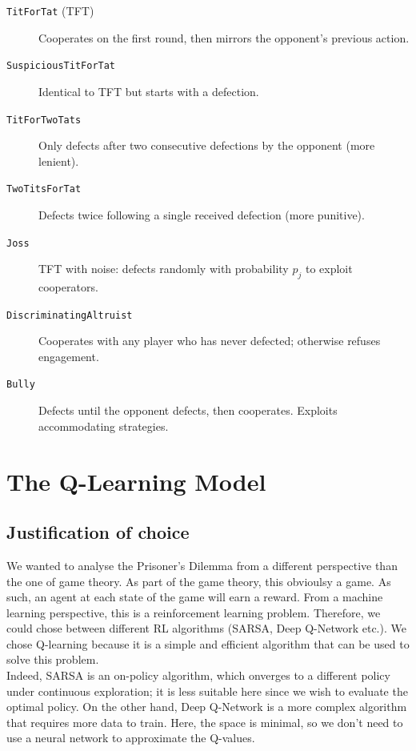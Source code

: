 \documentclass[11pt, a4paper]{article}
\begin{document}
\begin{description}
  \item[\texttt{TitForTat} (TFT)] Cooperates on the first round, then mirrors the opponent's previous action.
  \item[\texttt{SuspiciousTitForTat}] Identical to TFT but starts with a defection.
  \item[\texttt{TitForTwoTats}] Only defects after two consecutive defections by the opponent (more lenient).
  \item[\texttt{TwoTitsForTat}] Defects twice following a single received defection (more punitive).
  \item[\texttt{Joss}] TFT with noise: defects randomly with probability $p_j$ to exploit cooperators.
  \item[\texttt{DiscriminatingAltruist}] Cooperates with any player who has never defected; otherwise refuses engagement.
  \item[\texttt{Bully}] Defects until the opponent defects, then cooperates. Exploits accommodating strategies.
\end{description}
\newpage

\section{The Q-Learning Model}
\label{sec:qlearning}


\subsection{Justification of choice}

We wanted to analyse the Prisoner's Dilemma from a different perspective than the one of game theory. As part of the game theory, this obvioulsy a game. As such,
an agent at each state of the game will earn a reward. From a machine learning perspective, this is a reinforcement learning problem. 
Therefore, we could chose between different RL algorithms (SARSA, Deep Q-Network etc.). We chose Q-learning because it is a simple and efficient algorithm that can be used to solve this problem.\\

Indeed, SARSA is an on-policy algorithm, which onverges to a different policy under continuous exploration; it is less suitable here since we wish to evaluate the optimal policy. On the other hand, Deep Q-Network is a more complex algorithm that requires more data to train. Here, the space is minimal, so we don't need to use a neural network to approximate the Q-values.\\
\end{document}
